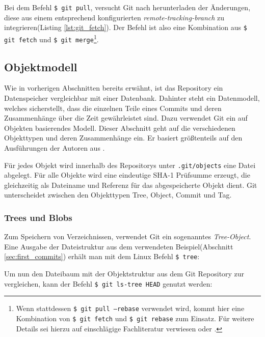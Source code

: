 Bei dem Befehl \texttt{\$ git pull}, versucht Git nach herunterladen der
Änderungen, diese aus einem entsprechend konfigurierten
\textit{remote-tracking-branch} zu integrieren(Listing \ref{lst:git_fetch}).
Der Befehl ist also eine Kombination aus \texttt{\$ git fetch} und \texttt{\$
git merge}\footnote{Wenn stattdessen \texttt{\$ git pull --rebase} verwendet
wird, kommt hier eine Kombination von \texttt{\$ git fetch} und \texttt{\$ git
rebase} zum Einsatz. Für weitere Details sei hierzu auf einschlägige
Fachliteratur verwiesen \cite[144-152]{gitosp} oder
\cite[85-88]{progit}.}.\cite[144-152]{gitosp}



\subsection{Objektmodell}\label{sec:objectmodel}
Wie in vorherigen Abschnitten bereits erwähnt, ist das Repository ein
Datenspeicher vergleichbar mit einer Datenbank. Dahinter steht ein Datenmodell,
welches sicherstellt, dass die einzelnen Teile eines Commits und deren
Zusammenhänge über die Zeit gewährleistet sind. Dazu verwendet Git ein auf
Objekten basierendes Modell. Dieser Abschnitt geht auf die verschiedenen
Objekttypen und deren Zusammenhänge ein. Er basiert größtenteils auf den
Ausführungen der Autoren aus \cite[S.~49-59]{gitosp}.

Für jedes Objekt wird innerhalb des Repositorys unter \texttt{.git/objects}
eine Datei abgelegt. Für alle Objekte wird eine eindeutige \gls{SHA-1}
Prüfsumme erzeugt, die gleichzeitig als Dateiname und Referenz für das
abgespeicherte Objekt dient. Git unterscheidet zwischen den Objekttypen Tree,
Object, Commit und Tag.

\subsubsection{Trees und Blobs}\label{sec:treeblobobjects}
Zum Speichern von Verzeichnissen, verwendet Git ein sogenanntes
\textit{Tree-Object}. Eine Ausgabe der Dateistruktur aus dem verwendeten
Beispiel(Abschnitt \ref{sec:first_commits}) erhält man mit dem Linux Befehl
\texttt{\$ tree}:



Um nun den Dateibaum mit der Objektstruktur aus dem Git Repository zur
vergleichen, kann der Befehl \texttt{\$ git ls-tree HEAD} genutzt werden:

